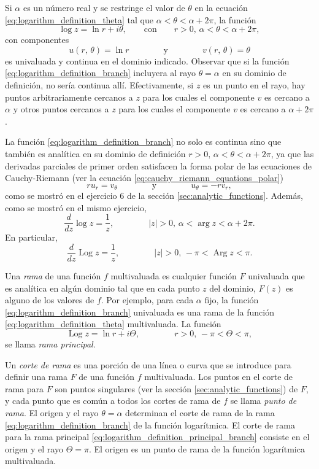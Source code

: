 \documentclass[a4paper]{report}
\DeclareMathOperator{\Arg}{Arg}
\DeclareMathOperator{\Log}{Log}
\begin{document}
Si \(\alpha\) es un número real y se restringe el valor de \(\theta\) en la ecuación \ref{eq:logarithm_definition_theta} tal que \(\alpha<\theta<\alpha+2\pi\), la función
\begin{equation}\label{eq:logarithm_definition_branch}
 \log z=\ln r+i\theta,
 \qquad\textrm{con}\qquad
 r>0,\,\alpha<\theta<\alpha+2\pi,
\end{equation}
con componentes
\[
 u(r,\,\theta)=\ln r
 \qquad\qquad\textrm{y}\qquad\qquad
 v(r,\,\theta)=\theta
\]
es univaluada y continua en el dominio indicado. Observar que si la función \ref{eq:logarithm_definition_branch} incluyera al rayo \(\theta=\alpha\) en su dominio de definición, no sería continua allí. Efectivamente, si \(z\) es un punto en el rayo, hay puntos arbitrariamente cercanos a \(z\) para los cuales el componente \(v\) es cercano a \(\alpha\) y otros puntos cercanos a \(z\) para los cuales el componente \(v\) es cercano a \(\alpha+2\pi\). 

La función \ref{eq:logarithm_definition_branch} no solo es continua sino que también es analítica en su dominio de definición \(r>0,\,\alpha<\theta<\alpha+2\pi\), ya que las derivadas parciales de primer orden satisfacen la forma polar de las ecuaciones de Cauchy-Riemann (ver la ecuación \ref{eq:cauchy_riemann_equations_polar}) 
\[
 ru_r=v_\theta 
 \qquad\qquad\textrm{y}\qquad\qquad
 u_\theta=-rv_r,
\]
como se mostró en el ejercicio 6 de la sección \ref{sec:analytic_functions}. Además, como se mostró en el mismo ejercicio,
\[
 \frac{d}{dz}\log z=\frac{1}{z},
 \qquad\qquad
 |z|>0,\,\alpha<\arg z<\alpha+2\pi.
\]
En particular,
\[
 \frac{d}{dz}\Log z=\frac{1}{z},
 \qquad\qquad
 |z|>0,\,-\pi<\Arg z<\pi.
\]

Una \emph{rama} de una función \(f\) multivaluada es cualquier función \(F\) univaluada que es analítica en algún dominio tal que en cada punto \(z\) del dominio, \(F(z)\) es alguno de los valores de \(f\). Por ejemplo, para cada \(\alpha\) fijo, la función \ref{eq:logarithm_definition_branch} univaluada es una rama de la función \ref{eq:logarithm_definition_theta} multivaluada. La función 
\begin{equation}\label{eq:logarithm_definition_principal_branch}
 \Log z=\ln r+i\Theta,
 \qquad\qquad
 r>0,\,-\pi<\Theta<\pi, 
\end{equation}
se llama \emph{rama principal}.

Un \emph{corte de rama} es una porción de una línea o curva que se introduce para definir una rama \(F\) de una función \(f\) multivaluada. Los puntos en el corte de rama para \(F\) son puntos singulares (ver la sección \ref{sec:analytic_functions}) de \(F\), y cada punto que es común a todos los cortes de rama de \(f\) se llama \emph{punto de rama}. El origen y el rayo \(\theta=\alpha\) determinan el corte de rama de la rama \ref{eq:logarithm_definition_branch} de la función logarítmica. El corte de rama para la rama principal \ref{eq:logarithm_definition_principal_branch} consiste en el origen y el rayo \(\Theta=\pi\). El origen es un punto de rama de la función logarítmica multivaluada.
\end{document}
